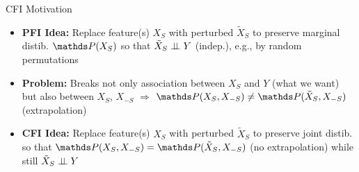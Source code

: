 \documentclass[10pt,compress,t,notes=noshow, xcolor=table]{beamer}
\begin{document}
\begin{frame}{CFI Motivation}

\begin{itemize}[<+->]
    \item \textbf{PFI Idea:} Replace feature(s) $X_S$ with perturbed $\tilde X_S$ to preserve marginal distib. $\P(X_S)$ so that $\tilde X_S \perp \!\!\! \perp Y$ (indep.), e.g., by random permutations
    \item \textbf{Problem:} Breaks not only association between $X_S$ and $Y$ (what we want) but also between $X_S$, $X_{-S}$ $\Rightarrow$ $\P(X_S, X_{-S}) \neq \P(\tilde X_S, X_{-S})$ (extrapolation)
    \item \textbf{CFI Idea:} Replace feature(s) $X_S$ with perturbed $\tilde X_S$ to preserve joint distib. so that $\P(X_S, X_{-S}) = \P(\tilde X_S, X_{-S})$ (no extrapolation) while still $\tilde X_S \perp \!\!\! \perp Y$
\end{itemize}

\medskip

\end{frame}
\end{document}
